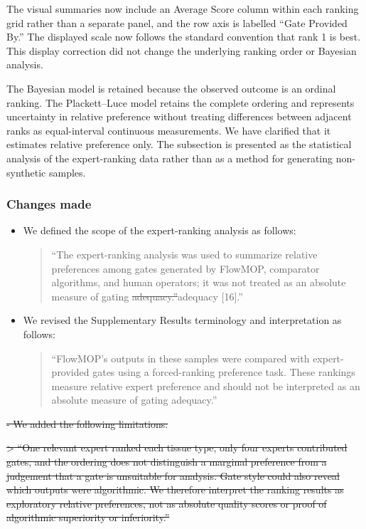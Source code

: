 \documentclass[
  11pt,
  a4paper,
]{article}
\begin{document}
The visual summaries now include an Average Score column within each
ranking grid rather than a separate panel, and the row axis is labelled
``Gate Provided By.'' The displayed scale now follows the standard
convention that rank 1 is best. This display correction did not change
the underlying ranking order or Bayesian analysis.

The Bayesian model is retained because the observed outcome is an
ordinal ranking. The Plackett--Luce model retains the complete ordering
and represents uncertainty in relative preference without treating
differences between adjacent ranks as equal-interval continuous
measurements. We have clarified that it estimates relative preference
only. The subsection is presented as the statistical analysis of the
expert-ranking data rather than as a method for generating non-synthetic
samples.

\subsubsection{Changes made}\label{changes-made-5}

\begin{itemize}
\item
  We defined the scope of the expert-ranking analysis as follows:

  \begin{quote}
  ``The expert-ranking analysis was used to summarize relative
  preferences among gates generated by FlowMOP, comparator algorithms,
  and human operators; it was not treated as an absolute measure of
  gating
  {\color{revisionred}\sout{adequacy.''}}{\color{revisionblue}adequacy
  {[}16{]}.''}
  \end{quote}
\item
  We revised the {\color{revisionblue}Supplementary} Results terminology
  and interpretation as follows:

  \begin{quote}
  ``FlowMOP's outputs in these samples were compared with
  expert-provided gates using a forced-ranking preference task. These
  rankings measure relative expert preference and should not be
  interpreted as an absolute measure of gating adequacy.''
  \end{quote}
\end{itemize}

{\color{revisionred}\sout{- We added the following limitations:}}

{\color{revisionred}\sout{ \textgreater{} ``One relevant expert ranked
each tissue type, only four experts contributed gates, and the ordering
does not distinguish a marginal preference from a judgement that a gate
is unsuitable for analysis. Gate style could also reveal which outputs
were algorithmic. We therefore interpret the ranking results as
exploratory relative preferences, not as absolute quality scores or
proof of algorithmic superiority or inferiority.''}}
\end{document}
